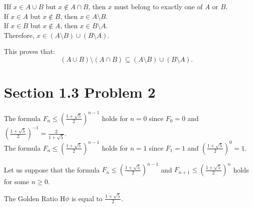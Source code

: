 \documentclass{report}
\begin{document}
\begin{RemarkWithLily}{2}
    IIf $x \in A \cup B$ but $x \notin A \cap B$, then $x$ must belong to exactly one of $A$ or $B$. \\
    If $x \in A$ but $x \notin B$, then $x \in A \setminus B$. \\
    If $x \in B$ but $x \notin A$, then $x \in B \setminus A$. \\
    
    Therefore, $x \in \left(A \setminus B\right) \cup \left(B \setminus A \right)$.

    This proves that:
    \[
    \left( A \cup B \right) \setminus \left( A \cap B \right) \subseteq \left(A \setminus B\right) \cup \left(B \setminus A \right).
    \]
\end{RemarkWithLily}


\section*{Section 1.3 Problem 2}


\begin{basecaseWithPoppy}
    The formula $F_{n} \leq \left(\frac{1 + \sqrt{5}}{2}\right)^{n-1}$ holds for $ n = 0 $ since $ F_{0} = 0 $ and $ \left(\frac{1 + \sqrt{5}}{2}\right)^{-1} = \frac{2}{1 + \sqrt{5}} $.  \\
    The formula $F_{n} \leq \left(\frac{1 + \sqrt{5}}{2}\right)^{n-1}$ holds for $ n = 1 $ since $ F_{1} = 1 $ and $ \left(\frac{1 + \sqrt{5}}{2}\right)^{0} = 1 $. 
\end{basecaseWithPoppy}

\begin{inducthypWithRose}
  Let us suppose that the formula $F_{n} \leq \left(\frac{1 + \sqrt{5}}{2}\right)^{n-1}$ and $F_{n+1} \leq \left(\frac{1 + \sqrt{5}}{2}\right)^{n}$ holds for some $n \geq 0$.
\end{inducthypWithRose}  

\begin{RemarkWithLily}{The Golden Ratio}
   H$\phi$ is equal to $\frac{1 + \sqrt{5}}{2}$.    
\end{RemarkWithLily}
\end{document}
